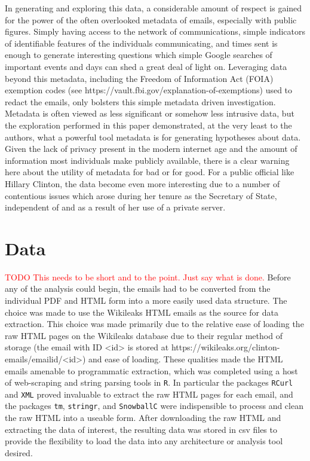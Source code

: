 \documentclass[journal]{vgtc}                %
\newcommand*{\TODO}[1]{\textcolor{red}{TODO #1}}
\begin{document}
In generating and exploring this data, a considerable amount of respect is gained for the power of the often overlooked metadata of emails, especially with public figures. Simply having access to the network of communications, simple indicators of identifiable features of the individuals communicating, and times sent is enough to generate interesting questions which simple Google searches of important events and days can shed a great deal of light on. Leveraging data beyond this metadata, including the Freedom of Information Act (FOIA) exemption codes (see https://vault.fbi.gov/explanation-of-exemptions) used to redact the emails, only bolsters this simple metadata driven investigation. Metadata is often viewed as less significant or somehow less intrusive data, but the exploration performed in this paper demonstrated, at the very least to the authors, what a powerful tool metadata is for generating hypotheses about data. Given the lack of privacy present in the modern internet age and the amount of information most individuals make publicly available, there is a clear warning here about the utility of metadata for bad or for good. For a public official like Hillary Clinton, the data become even more interesting due to a number of contentious issues which arose during her tenure as the Secretary of State, independent of and as a result of her use of a private server.

\section{Data}

\TODO{This needs to be short and to the point.  Just say what is done.}
Before any of the analysis could begin, the emails had to be converted from the individual PDF and HTML form into a more easily used data structure. The choice was made to use the Wikileaks HTML emails as the source for data extraction. This choice was made primarily due to the relative ease of loading the raw HTML pages on the Wikileaks database due to their regular method of storage (the email with ID <id> is stored at https://wikileaks.org/clinton-emails/emailid/<id>) and ease of loading. These qualities made the HTML emails amenable to programmatic extraction, which was completed using a host of web-scraping and string parsing tools in \texttt{R}. In particular the packages \texttt{RCurl} and \texttt{XML} proved invaluable to extract the raw HTML pages for each email, and the packages \texttt{tm}, \texttt{stringr}, and \texttt{SnowballC} were indispensible to process and clean the raw HTML into a useable form. After downloading the raw HTML and extracting the data of interest, the resulting data was stored in csv files to provide the flexibility to load the data into any architecture or analysis tool desired.
\end{document}
